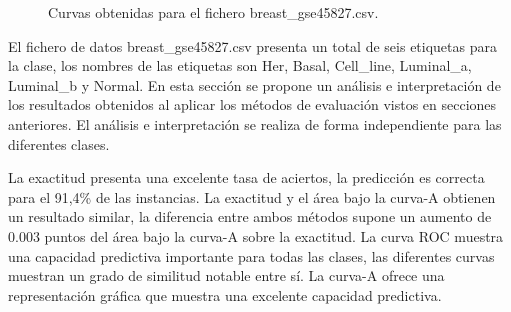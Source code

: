 \bigbreak

\begin{figure}[htp]
    \centering
    \caption{Curvas obtenidas para el fichero breast\_gse45827.csv.}
    \label{fig:11}
\end{figure}

\bigbreak

El fichero de datos breast\_gse45827.csv presenta un total de seis etiquetas para la clase, los nombres de las etiquetas son Her, Basal, Cell\_line, Luminal\_a, Luminal\_b y Normal. En esta sección se propone un análisis e interpretación de los resultados obtenidos al aplicar los métodos de evaluación vistos en secciones anteriores. El análisis e interpretación se realiza de forma independiente para las diferentes clases.

\bigbreak

La exactitud presenta una excelente tasa de aciertos, la predicción es correcta para el 91,4\% de las instancias. La exactitud y el área bajo la curva-A obtienen un resultado similar, la diferencia entre ambos métodos supone un aumento de $0.003$ puntos del área bajo la curva-A sobre la exactitud. La curva ROC muestra una capacidad predictiva importante para todas las clases, las diferentes curvas muestran un grado de similitud notable entre sí. La curva-A ofrece una representación gráfica que muestra una excelente capacidad predictiva.

\bigbreak

